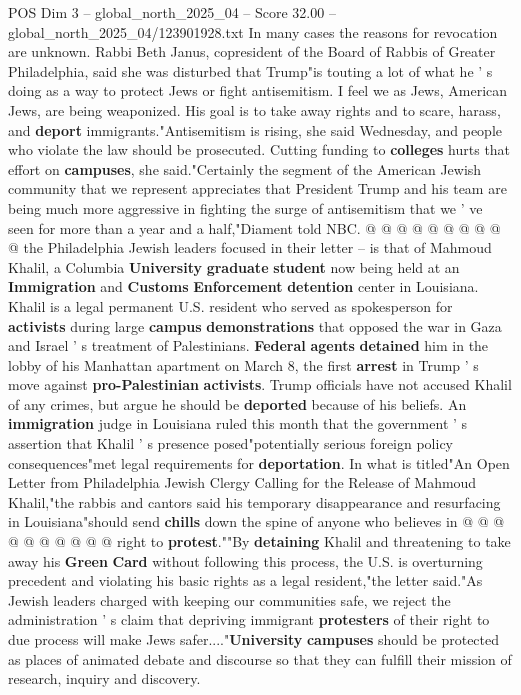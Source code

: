 \begin{textsample}{POS Dim 3 – global\_north\_2025\_04 – Score 32.00 – global\_north\_2025\_04/123901928.txt}
In many cases the reasons for revocation are unknown.
Rabbi Beth Janus, copresident of the Board of Rabbis of Greater Philadelphia, said she was disturbed that Trump"is touting a lot of what he ' s doing as a way to protect Jews or fight antisemitism.
I feel we as Jews, American Jews, are being weaponized.
His goal is to take away rights and to scare, harass, and \textbf{deport} immigrants."Antisemitism is rising, she said Wednesday, and people who violate the law should be prosecuted.
Cutting funding to \textbf{colleges} hurts that effort on \textbf{campuses}, she said."Certainly the segment of the American Jewish community that we represent appreciates that President Trump and his team are being much more aggressive in fighting the surge of antisemitism that we ' ve seen for more than a year and a half,"Diament told NBC. @ @ @ @ @ @ @ @ @ @ the Philadelphia Jewish leaders focused in their letter -- is that of Mahmoud Khalil, a Columbia \textbf{University} \textbf{graduate} \textbf{student} now being held at an \textbf{Immigration} and \textbf{Customs} \textbf{Enforcement} \textbf{detention} center in Louisiana.
Khalil is a legal permanent U.S. resident who served as spokesperson for \textbf{activists} during large \textbf{campus} \textbf{demonstrations} that opposed the war in Gaza and Israel ' s treatment of Palestinians. \textbf{Federal} \textbf{agents} \textbf{detained} him in the lobby of his Manhattan apartment on March 8, the first \textbf{arrest} in Trump ' s move against \textbf{pro-Palestinian} \textbf{activists}.
Trump officials have not accused Khalil of any crimes, but argue he should be \textbf{deported} because of his beliefs.
An \textbf{immigration} judge in Louisiana ruled this month that the government ' s assertion that Khalil ' s presence posed"potentially serious foreign policy consequences"met legal requirements for \textbf{deportation}.
In what is titled"An Open Letter from Philadelphia Jewish Clergy Calling for the Release of Mahmoud Khalil,"the rabbis and cantors said his temporary disappearance and resurfacing in Louisiana"should send \textbf{chills} down the spine of anyone who believes in @ @ @ @ @ @ @ @ @ @ right to \textbf{protest}.""By \textbf{detaining} Khalil and threatening to take away his \textbf{Green} \textbf{Card} without following this process, the U.S. is overturning precedent and violating his basic rights as a legal resident,"the letter said."As Jewish leaders charged with keeping our communities safe, we reject the administration ' s claim that depriving immigrant \textbf{protesters} of their right to due process will make Jews safer...."\textbf{University} \textbf{campuses} should be protected as places of animated debate and discourse so that they can fulfill their mission of research, inquiry and discovery.

\end{textsample}
